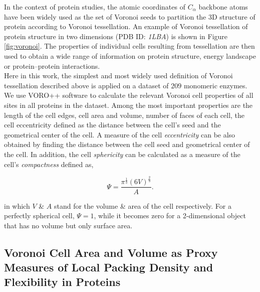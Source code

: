 \documentclass[11pt]{article}
\begin{document}

    In the context of protein studies, the atomic coordinates of $C_\alpha$ backbone atoms have been widely used as the set of Voronoi seeds to partition the 3D structure of protein according to Voronoi tessellation. An example of Voronoi tessellation of protein structure in two dimensions (PDB ID: {\it 1LBA}) is shown in Figure \ref{fig:voronoi}.  The properties of individual cells resulting from tessellation are then used to obtain a wide range of information on protein structure, energy landscape or protein--protein interactions. \\

    Here in this work, the simplest and most widely used definition of Voronoi tessellation described above is applied on a dataset of $209$  monomeric enzymes. We use VORO++ software \cite{rycroft_voro++:_2009} to calculate the relevant Voronoi cell properties of all sites in all proteins in the dataset. Among the most important properties are the length of the cell edges, cell area and volume, number of faces of each cell, the cell eccentricity defined as the distance between the cell's seed and the geometrical center of the cell. A measure of the cell {\it eccentricity} can be also obtained by finding the distance between the cell seed and geometrical center of the cell. In addition, the cell {\it sphericity} can be calculated as a measure of the cell's {\it compactness} defined as,

    \begin{equation}
        \label{eqn:sphericity}
        \Psi = \frac{\pi^{\frac{1}{3}}(6V)^{\frac{2}{3}}}{A}.
    \end{equation}

    \noindent in which $V$ \& $A$ stand for the volume \& area of the cell respectively. For a perfectly spherical cell, $\Psi=1$, while it becomes zero for a 2-dimensional object that has no volume but only surface area.

    \subsection*{Voronoi Cell Area and Volume as Proxy Measures of Local Packing Density and Flexibility in Proteins}


\end{document}
